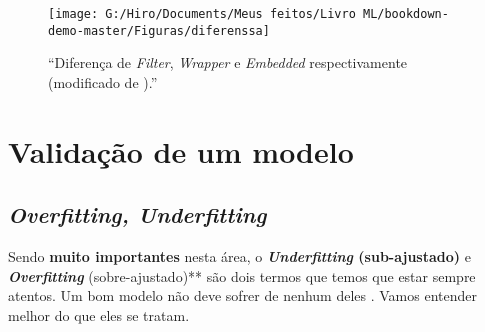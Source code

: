 \documentclass[
]{book}
\begin{document}
\begin{figure}

{\centering \texttt{[image: G:/Hiro/Documents/Meus feitos/Livro ML/bookdown-demo-master/Figuras/diferenssa]} 

}

\caption{``Diferença de \emph{Filter}, \emph{Wrapper} e \emph{Embedded} respectivamente (modificado de \citet{covoes2010seleccao}).''}\label{fig:diferenssa}
\end{figure}



\hypertarget{valid}{%
\chapter{Validação de um modelo}\label{valid}}

\hypertarget{fitt}{%
\section{\texorpdfstring{\emph{Overfitting, Underfitting}}{Overfitting, Underfitting}}\label{fitt}}

Sendo \textbf{muito importantes} nesta área, o \textbf{\emph{Underfitting} (sub-ajustado)} e \textbf{\emph{Overfitting}} (sobre-ajustado)** são dois termos que temos que estar sempre atentos. Um bom modelo não deve sofrer de nenhum deles \citep{silver2013sinal}. Vamos entender melhor do que eles se tratam.
\end{document}
